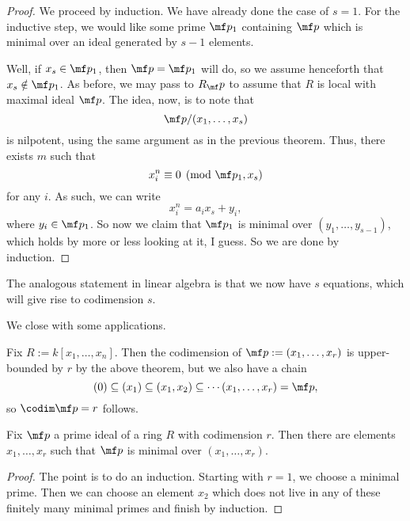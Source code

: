 \begin{proof}
	We proceed by induction. We have already done the case of $s=1$. For the inductive step, we would like some prime $\mf p_1$ containing $\mf p$ which is minimal over an ideal generated by $s-1$ elements.

	Well, if $x_s\in\mf p_1$, then $\mf p=\mf p_1$ will do, so we assume henceforth that $x_s\notin\mf p_1$. As before, we may pass to $R_\mf p$ to assume that $R$ is local with maximal ideal $\mf p$. The idea, now, is to note that
	\[\mf p/(x_1,\ldots,x_s)\]
	is nilpotent, using the same argument as in the previous theorem. Thus, there exists $m$ such that
	\[x_i^n\equiv0\pmod{\mf p_1,x_s}\]
	for any $i$. As such, we can write
	\[x_i^n=a_ix_s+y_i,\]
	where $y_i\in\mf p_1$. So now we claim that $\mf p_1$ is minimal over $(y_1,\ldots,y_{s-1})$, which holds by more or less looking at it, I guess. So we are done by induction.
\end{proof}
\begin{remark}
	The analogous statement in linear algebra is that we now have $s$ equations, which will give rise to codimension $s$.
\end{remark}
We close with some applications.
\begin{example}
	Fix $R:=k[x_1,\ldots,x_n]$. Then the codimension of $\mf p:=(x_1,\ldots,x_r)$ is upper-bounded by $r$ by the above theorem, but we also have a chain
	\[(0)\subseteq(x_1)\subseteq(x_1,x_2)\subseteq\cdots(x_1,\ldots,x_r)=\mf p,\]
	so $\codim\mf p=r$ follows.
\end{example}
\begin{cor}
	Fix $\mf p$ a prime ideal of a ring $R$ with codimension $r$. Then there are elements $x_1,\ldots,x_r$ such that $\mf p$ is minimal over $(x_1,\ldots,x_r)$.
\end{cor} %
\begin{proof}
	The point is to do an induction. Starting with $r=1$, we choose a minimal prime. Then we can choose an element $x_2$ which does not live in any of these finitely many minimal primes and finish by induction.
\end{proof}